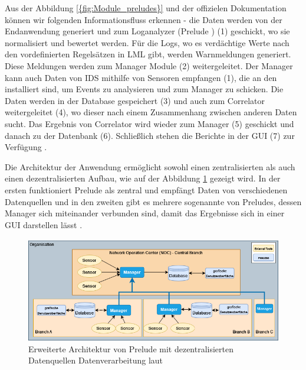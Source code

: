 Aus der Abbildung \ref{{fig:Module_preludes}} und der offizielen Dokumentation können wir folgenden Informationsfluss erkennen - die Daten werden von der Endanwendung generiert und zum Loganalyzer (Prelude ) (1) geschickt, wo sie normalisiert und bewertet werden. Für die Logs, wo es verdächtige Werte nach den vordefinierten Regelsätzen in \gls{LML} gibt, werden Warnmeldungen generiert. Diese Meldungen werden zum Manager Module (2) weitergeleitet. Der Manager kann auch Daten von \gls{IDS} mithilfe von Sensoren empfangen (1), die an den  installiert sind, um Events zu analysieren und zum Manager zu schicken. Die Daten werden in der Database gespeichert (3) und auch zum Correlator weitergeleitet (4), wo dieser nach einem Zusammenhang zwischen anderen Daten sucht. Das Ergebnis von Correlator wird wieder zum Manager (5) geschickt und danach zu der Datenbank (6). Schließlich stehen die Berichte in der \gls{GUI} (7) zur Verfügung \citep{Prelude_Doc}.

Die Architektur der Anwendung ermöglicht sowohl einen zentralisierten als auch einen dezentralisierten Aufbau, wie auf der Abbildung \ref{fig:Prelude_erweitert} gezeigt wird. In der ersten funktioniert Prelude als zentral und empfängt Daten von verschiedenen Datenquellen und in den zweiten gibt es mehrere sogenannte  von Preludes, dessen Manager sich miteinander verbunden sind, damit das Ergebnisse sich in einer \gls{GUI} darstellen lässt \citep{Prelude_MU}.

\begin{figure}[H]
   \centering
   \includegraphics[width=1\textwidth]{assets/Branch_Prelude.drawio.png}
   \caption[Erweiterte Architektur von Prelude mit dezentralisierten Datenquellen und Datenverarbeitung]
   {Erweiterte Architektur von Prelude mit dezentralisierten Datenquellen Datenverarbeitung laut \cite{Prelude_MU}}
   \label{fig:Prelude_erweitert}
   \centering
\end{figure}

